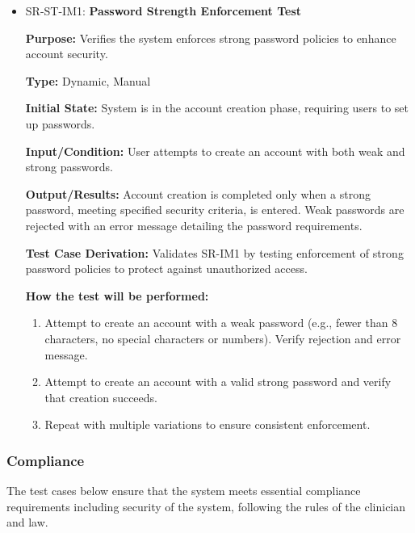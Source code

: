 \documentclass[12pt, titlepage]{article}
\begin{document}
\begin{itemize}
  \item SR-ST-IM1: \textbf{Password Strength Enforcement Test}
  \begin{mdframed}[linewidth=0.5mm]
      \textbf{Purpose:} Verifies the system enforces strong password policies to enhance account security. \par
      \textbf{Type:} Dynamic, Manual \par
      \textbf{Initial State:} System is in the account creation phase, requiring users to set up passwords. \par
      \textbf{Input/Condition:} User attempts to create an account with both weak and strong passwords. \par
      \textbf{Output/Results:} Account creation is completed only when a strong password, meeting specified security criteria, is entered. Weak passwords are rejected with an error message detailing the password requirements. \par
      \textbf{Test Case Derivation:} Validates SR-IM1 by testing enforcement of strong password policies to protect against unauthorized access. \par
      \textbf{How the test will be performed:}
      \begin{enumerate}[noitemsep]
        \item Attempt to create an account with a weak password (e.g., fewer than 8 characters, no special characters or numbers). Verify rejection and error message.
        \item Attempt to create an account with a valid strong password and verify that creation succeeds.
        \item Repeat with multiple variations to ensure consistent enforcement.
      \end{enumerate}
  \end{mdframed}

\end{itemize}

\subsubsection{Compliance}

The test cases below ensure that the system meets essential 
compliance requirements including security of the system, following the rules of the clinician and law.
\end{document}
